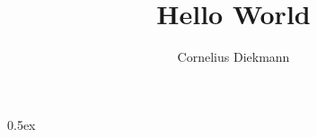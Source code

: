\documentclass[11pt,a4paper]{article}
\begin{document}
\title{Hello World}
\author{Cornelius Diekmann}
\maketitle

\tableofcontents

\parindent 0pt\parskip 0.5ex



%
%
\end{document}
